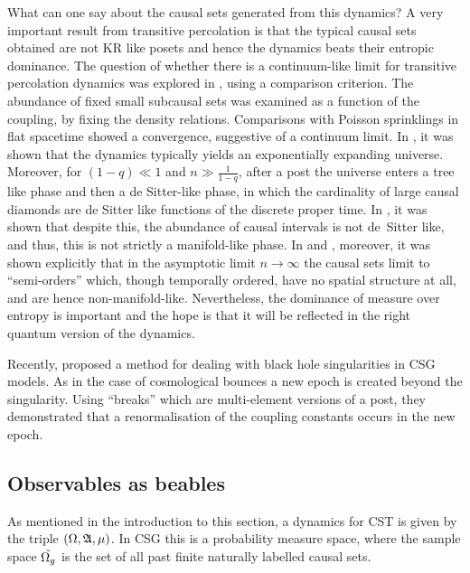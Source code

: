 What can one say about the causal sets generated from this dynamics?  A very important result from
transitive percolation is that the typical causal sets obtained are not 
KR like posets and hence the dynamics beats their entropic dominance. The question of whether there is a
continuum-like limit for transitive percolation dynamics was explored in \cite{csgtwo}, using a comparison
criterion. The abundance of fixed small subcausal sets was examined as a function of the coupling, by fixing the
density relations. Comparisons with Poisson sprinklings in flat spacetime showed a convergence, suggestive of  a continuum
limit. In \cite{davidmaqbool}, it was shown that the dynamics typically yields an exponentially expanding
universe. Moreover, for $(1-q) \ll 1 $ and $n \gg \frac{1}{1-q}$, after a post the universe enters a tree like phase and then
a de Sitter-like phase, in which the cardinality of large causal diamonds are de Sitter like functions of the discrete
proper time.  In \cite{intervals}, it was shown that despite this, the abundance of causal intervals is not de~Sitter
like, and thus, this is not strictly a manifold-like phase. In \cite{grnick} and \cite{grahammalwina}, moreover, it was shown
explicitly that in the asymptotic limit $n \rightarrow \infty$ the causal sets limit to ``semi-orders'' which,  though temporally
ordered,  have no spatial structure at all,  and are hence non-manifold-like. Nevertheless, the dominance of measure
over entropy is important and the hope is that it will be reflected in the right quantum version of the dynamics. 



Recently, \cite{faystav} proposed a method for  dealing with black hole singularities in CSG models. As in the case of cosmological
bounces a  new epoch is  created beyond the singularity. Using ``breaks'' which are multi-element versions of a post,
they demonstrated that a renormalisation of the coupling constants occurs in the new epoch. 

\subsection{Observables as beables}
\label{ssec:beable}

As mentioned in the introduction to this section, a dynamics for CST is given by the triple $(\Omega, \mathfrak A, \mu)$.  In
CSG this is  a probability measure space, where the sample space $\tilde {\Omega_g}$ is the set of all past finite naturally labelled
causal sets.

